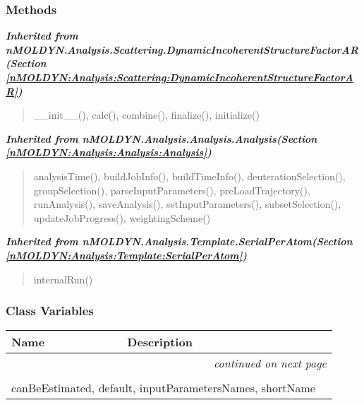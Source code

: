 
  \subsubsection{Methods}


\large{\textbf{\textit{Inherited from nMOLDYN.Analysis.Scattering.DynamicIncoherentStructureFactorAR\textit{(Section \ref{nMOLDYN:Analysis:Scattering:DynamicIncoherentStructureFactorAR})}}}}

\begin{quote}
\_\_init\_\_(), calc(), combine(), finalize(), initialize()
\end{quote}

\large{\textbf{\textit{Inherited from nMOLDYN.Analysis.Analysis.Analysis\textit{(Section \ref{nMOLDYN:Analysis:Analysis:Analysis})}}}}

\begin{quote}
analysisTime(), buildJobInfo(), buildTimeInfo(), deuterationSelection(), groupSelection(), parseInputParameters(), preLoadTrajectory(), runAnalysis(), saveAnalysis(), setInputParameters(), subsetSelection(), updateJobProgress(), weightingScheme()
\end{quote}

\large{\textbf{\textit{Inherited from nMOLDYN.Analysis.Template.SerialPerAtom\textit{(Section \ref{nMOLDYN:Analysis:Template:SerialPerAtom})}}}}

\begin{quote}
internalRun()
\end{quote}


  \subsubsection{Class Variables}

    \vspace{-1cm}
\hspace{\varindent}\begin{longtable}{|p{\varnamewidth}|p{\vardescrwidth}|l}
\cline{1-2}
\cline{1-2} \centering \textbf{Name} & \centering \textbf{Description}& \\
\cline{1-2}
\endhead\cline{1-2}\multicolumn{3}{r}{\small\textit{continued on next page}}\\\endfoot\cline{1-2}
\endlastfoot\multicolumn{2}{|l|}{\textit{Inherited from nMOLDYN.Analysis.Scattering.DynamicIncoherentStructureFactorAR \textit{(Section \ref{nMOLDYN:Analysis:Scattering:DynamicIncoherentStructureFactorAR})}}}\\
\multicolumn{2}{|p{\varwidth}|}{\raggedright canBeEstimated, default, inputParametersNames, shortName}\\
\cline{1-2}
\end{longtable}

